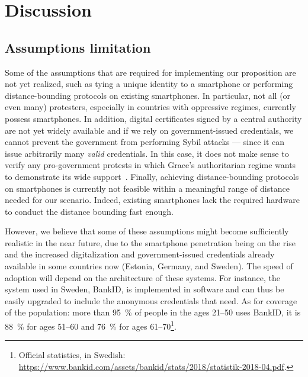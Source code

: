 \section{Discussion}%
\label{Discussion}




\subsection{Assumptions limitation} 

Some of the assumptions that are required for implementing our proposition are not yet realized, such as tying a unique identity to a smartphone or performing distance-bounding protocols on existing smartphones. 
In particular, not all (or even many) protesters, especially in countries with oppressive regimes, currently possess smartphones.
In addition, digital certificates signed by a central authority are not yet widely available and if we rely on government-issued credentials, we cannot prevent the government from performing Sybil attacks --- since it can issue arbitrarily many \emph{valid} credentials.
In this case, it does not make sense to verify any pro-government protests in which Grace's authoritarian regime wants to demonstrate its wide support~\cite{AlJazeeraOnVenezuela2017,VenezuelanStateWorkersCalledToParticipate}.
Finally, achieving distance-bounding protocols on smartphones is currently not feasible within a meaningful range of distance needed for our scenario.
Indeed, existing smartphones lack the required hardware to conduct the distance bounding fast enough.

However, we believe that some of these assumptions might become sufficiently realistic in the near future, due to the smartphone penetration being on the rise and the increased digitalization and government-issued credentials already available in some countries now (\eg Estonia, Germany, and Sweden). 
The speed of adoption will depend on the architecture of these systems.
For instance, the system used in Sweden, BankID, is implemented in software and can thus be easily upgraded to include the anonymous credentials that \PRIVO need.
As for coverage of the population: more than \SI{95}{\%} of people in the ages 21--50 uses BankID, it is \SI{88}{\%} for ages 51--60 and \SI{76}{\%} for ages 61--70\footnote{Official statistics, in Swedish:  \url{https://www.bankid.com/assets/bankid/stats/2018/statistik-2018-04.pdf}.}.

